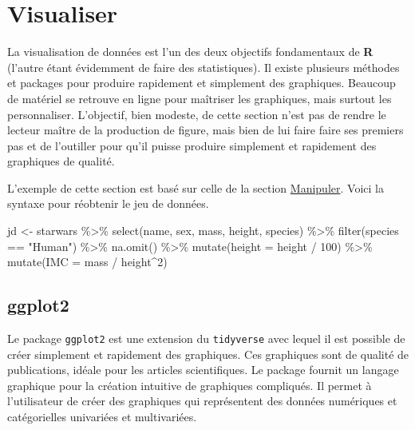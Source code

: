 \documentclass[
]{book}
\newenvironment{Shaded}{}{}
\newcommand{\AttributeTok}[1]{#1}
\newcommand{\DecValTok}[1]{#1}
\newcommand{\FunctionTok}[1]{#1}
\newcommand{\NormalTok}[1]{#1}
\newcommand{\OtherTok}[1]{#1}
\newcommand{\SpecialCharTok}[1]{#1}
\newcommand{\StringTok}[1]{#1}
\begin{document}
\hypertarget{visualiser}{%
\chapter{Visualiser}\label{visualiser}}

La visualisation de données est l'un des deux objectifs fondamentaux de \textbf{R} (l'autre étant évidemment de faire des statistiques). Il existe plusieurs méthodes et packages pour produire rapidement et simplement des graphiques. Beaucoup de matériel se retrouve en ligne pour maîtriser les graphiques, mais surtout les personnaliser. L'objectif, bien modeste, de cette section n'est pas de rendre le lecteur maître de la production de figure, mais bien de lui faire faire ses premiers pas et de l'outiller pour qu'il puisse produire simplement et rapidement des graphiques de qualité.

L'exemple de cette section est basé sur celle de la section \protect\hyperlink{manipuler}{Manipuler}. Voici la syntaxe pour réobtenir le jeu de données.

\begin{Shaded}
\begin{Highlighting}[]
\NormalTok{jd }\OtherTok{\textless{}{-}}\NormalTok{ starwars }\SpecialCharTok{\%\textgreater{}\%} 
  \FunctionTok{select}\NormalTok{(name, sex, mass, height, species) }\SpecialCharTok{\%\textgreater{}\%} 
  \FunctionTok{filter}\NormalTok{(species }\SpecialCharTok{==} \StringTok{"Human"}\NormalTok{) }\SpecialCharTok{\%\textgreater{}\%} 
  \FunctionTok{na.omit}\NormalTok{() }\SpecialCharTok{\%\textgreater{}\%} 
  \FunctionTok{mutate}\NormalTok{(}\AttributeTok{height =}\NormalTok{ height  }\SpecialCharTok{/} \DecValTok{100}\NormalTok{) }\SpecialCharTok{\%\textgreater{}\%} 
  \FunctionTok{mutate}\NormalTok{(}\AttributeTok{IMC =}\NormalTok{ mass }\SpecialCharTok{/}\NormalTok{ height}\SpecialCharTok{\^{}}\DecValTok{2}\NormalTok{)  }
\end{Highlighting}
\end{Shaded}

\hypertarget{ggplot2}{%
\section{ggplot2}\label{ggplot2}}

Le package \texttt{ggplot2} est une extension du \texttt{tidyverse} avec lequel il est possible de créer simplement et rapidement des graphiques. Ces graphiques sont de qualité de publications, idéale pour les articles scientifiques. Le package fournit un langage graphique pour la création intuitive de graphiques compliqués. Il permet à l'utilisateur de créer des graphiques qui représentent des données numériques et catégorielles univariées et multivariées.
\end{document}
